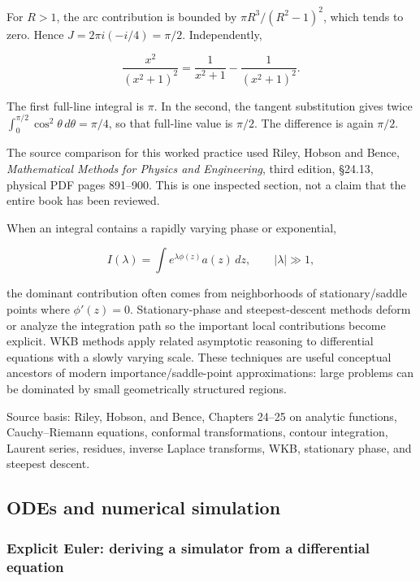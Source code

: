For \(R>1\), the arc contribution is bounded by \(\pi R^3/(R^2-1)^2\), which tends to zero. Hence \(J=2\pi i(-i/4)=\pi/2\). Independently,

\[
\frac{x^2}{(x^2+1)^2}=\frac{1}{x^2+1}-\frac{1}{(x^2+1)^2}.
\]

The first full-line integral is \(\pi\). In the second, the tangent substitution gives twice \(\int_0^{\pi/2}\cos^2\theta\,d\theta=\pi/4\), so that full-line value is \(\pi/2\). The difference is again \(\pi/2\).

The source comparison for this worked practice used Riley, Hobson and Bence, \emph{Mathematical Methods for Physics and Engineering}, third edition, §24.13, physical PDF pages 891--900. This is one inspected section, not a claim that the entire book has been reviewed.

When an integral contains a rapidly varying phase or exponential,

\[
I(\lambda)
=
\int e^{\lambda\phi(z)}a(z)\,dz,
\qquad |\lambda|\gg1,
\]

the dominant contribution often comes from neighborhoods of stationary/saddle points where \(\phi'(z)=0\). Stationary-phase and steepest-descent methods deform or analyze the integration path so the important local contributions become explicit. WKB methods apply related asymptotic reasoning to differential equations with a slowly varying scale. These techniques are useful conceptual ancestors of modern importance/saddle-point approximations: large problems can be dominated by small geometrically structured regions.

Source basis: Riley, Hobson, and Bence, Chapters 24--25 on analytic functions, Cauchy--Riemann equations, conformal transformations, contour integration, Laurent series, residues, inverse Laplace transforms, WKB, stationary phase, and steepest descent.

\subsection{ODEs and numerical simulation}\label{02-foundations-ii-ch025-odes-and-numerical-simulation}

\subsubsection{Explicit Euler: deriving a simulator from a differential equation}\label{02-foundations-ii-ch025-explicit-euler-deriving-a-simulator-from-a-differential-equation}

